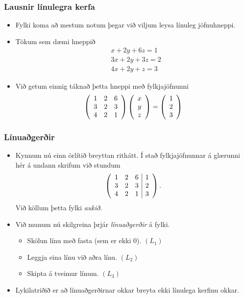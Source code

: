 \documentclass{beamer}
\begin{document}
\begin{frame}
	\frametitle{Lausnir línulegra kerfa}
	\begin{itemize}
		\item<1-> Fylki koma að mestum notum þegar við viljum leysa línuleg jöfnuhneppi.
		\item<2-> Tökum sem dæmi hneppið
			\begin{align*}
				& x + 2y + 6z = 1\\
				& 3x + 2y + 3z = 2\\
				& 4x + 2y + z = 3
			\end{align*}
		\item<3-> Við getum einnig táknað þetta hneppi með fylkjajöfnunni
			\[
				\left (
				\begin{array}{c c c}
					1 & 2 & 6\\
					3 & 2 & 3\\
					4 & 2 & 1
				\end{array}
				\right )
				\left (
				\begin{array}{c}
					x\\
					y\\
					z
				\end{array}
				\right )
				=
				\left (
				\begin{array}{c}
					1\\
					2\\
					3
				\end{array}
				\right )
			\]
	\end{itemize}
\end{frame}

\begin{frame}
	\frametitle{Línuaðgerðir}
	\begin{itemize}
		\item<1-> Kynnum nú einn örlítið breyttan rithátt. Í stað fylkjajöfnunnar á glærunni hér á undann skrifum við stundum
			\[
				\left (
				\begin{array}{c c c | c}
					1 & 2 & 6 & 1\\
					3 & 2 & 3 & 2\\
					4 & 2 & 1 & 3
				\end{array}
				\right ).
			\]
			Við köllum þetta fylki \emph{aukið}.
		\item<2-> Við munum nú skilgreina þrjár \emph{línuaðgerðir} á fylki.
			\begin{itemize}
				\item<3-> Skölun línu með fasta (sem er ekki $0$). $(L_1)$
				\item<4-> Leggja eina línu við aðra línu. $(L_2)$
				\item<5-> Skipta á tveimur línum. $(L_3)$
			\end{itemize}
		\item<6-> Lykilatriðið er að línuaðgerðirnar okkar breyta ekki línulega kerfinu okkar.
	\end{itemize}
\end{frame}
\end{document}
